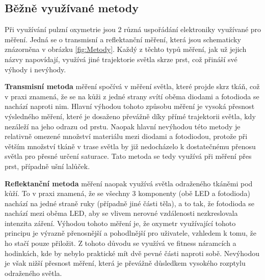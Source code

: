 \subsection {Běžně využívané metody}
Při využívání pulzní oxymetrie jsou 2 různá uspořádání elektroniky využívané pro měření. Jedná se o transmisní a reflektanční měření, která jsou schematicky znázorněna v obrázku \ref{fig:Metody}. Každý z těchto typů měření, jak už jejich názvy napovídají, využívá jiné trajektorie světla skrze prst, což přináší své výhody i nevýhody.
\par \textbf{Transmisní metoda} měření spočívá v měření světla, které projde skrz tkáň, což v praxi znamená, že se na kůži z jedné strany svítí oběma diodami a fotodioda se nachází naproti nim. Hlavní výhodou tohoto způsobu měření je vysoká přesnost výsledného měření, které je dosaženo převážně díky přímé trajektorii světla, kdy nezáleží na jeho odrazu od prstu. Naopak hlavní nevýhodou této metody je relativně omezené množství materiálu mezi diodami a fotodiodou, protože při větším množství tkáně v trase světla by již nedocházelo k dostatečnému přenosu světla pro přesné určení saturace. Tato metoda se tedy využívá při měření přes prst, případně ušní lalůček. %
\par \textbf{Reflektanční metoda} měření naopak využívá světla odraženého tkáněmi pod kůží. To v praxi znamená, že se všechny 3 komponenty (obě LED a fotodioda) nachází na jedné straně ruky (případně jiné části těla), a to tak, že fotodioda se nachází mezi oběma LED, aby se vlivem nerovné vzdálenosti nezkreslovala intenzita záření. Výhodou tohoto měření je, že oxymetr využívající tohoto principu je výrazně přenosnější a pohodlnější pro uživatele, vzhledem k tomu, že ho stačí pouze přiložit. Z tohoto důvodu se využívá ve fitness náramcích a hodinkách, kde by nebylo praktické mít dvě pevné části naproti sobě. Nevýhodou je však nižší přesnost měření, která je převážně důsledkem vysokého rozptylu odraženého světla.